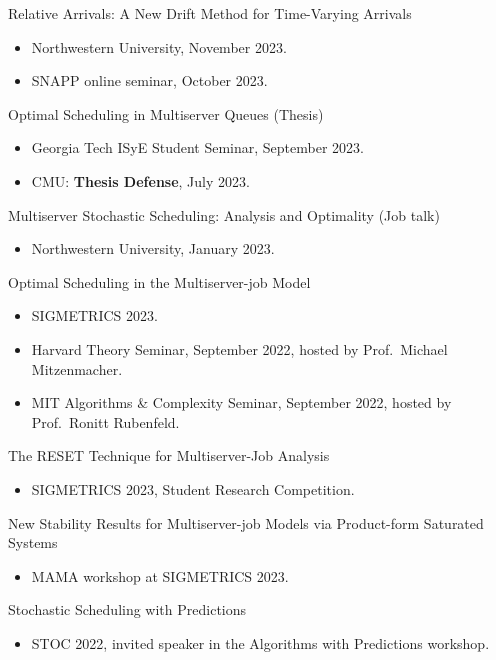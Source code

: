 \documentclass{res}
\begin{document}
\begin{resume}
    Relative Arrivals: A New Drift Method for Time-Varying Arrivals
    \begin{itemize}
        \item Northwestern University, November 2023.
        \item SNAPP online seminar, October 2023.
    \end{itemize}

    Optimal Scheduling in Multiserver Queues (Thesis)
    \begin{itemize}
        \item Georgia Tech ISyE Student Seminar, September 2023.
        \item CMU: \textbf{Thesis Defense}, July 2023.
    \end{itemize}

    Multiserver Stochastic Scheduling: Analysis and Optimality (Job talk)
    \begin{itemize}
        \item Northwestern University, January 2023.
    \end{itemize}

    Optimal Scheduling in the Multiserver-job Model
    \begin{itemize}
        \item SIGMETRICS 2023.
        \item Harvard Theory Seminar, September 2022, hosted by Prof.~Michael Mitzenmacher.
        \item MIT Algorithms \& Complexity Seminar, September 2022, hosted by Prof.~Ronitt Rubenfeld.
    \end{itemize}

    The RESET Technique for Multiserver-Job Analysis
    \begin{itemize}
        \item SIGMETRICS 2023, Student Research Competition. 
    \end{itemize}

    New Stability Results for Multiserver-job Models via Product-form Saturated Systems
    \begin{itemize}
        \item MAMA workshop at SIGMETRICS 2023.
    \end{itemize}

    Stochastic Scheduling with Predictions
    \begin{itemize}
        \item STOC 2022, invited speaker in the Algorithms with Predictions workshop.
    \end{itemize}


\end{resume}
\end{document}
